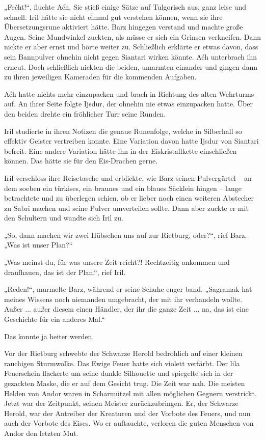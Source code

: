 „Fećht!“, fluchte Aćh. Sie stieß einige Sätze auf Tulgorisch aus, ganz leise und schnell. Iril hätte sie nicht einmal gut verstehen können, wenn sie ihre Übersetzungsrune aktiviert hätte. Barz hingegen verstand und machte große Augen. Seine Mundwinkel zuckten, als müsse er sich ein Grinsen verkneifen. Dann nickte er aber ernst und hörte weiter zu. Schließlich erklärte er etwas davon, dass sein Bannpulver ohnehin nicht gegen Siantari wirken könnte. Aćh unterbrach ihn erneut. Doch schließlich nickten die beiden, umarmten einander und gingen dann zu ihren jeweiligen Kameraden für die kommenden Aufgaben.

Aćh hatte nichts mehr einzupacken und brach in Richtung des alten Wehrturms auf. An ihrer Seite folgte Ijsdur, der ohnehin nie etwas einzupacken hatte. Über den beiden drehte ein fröhlicher Turr seine Runden.

Iril studierte in ihren Notizen die genaue Runenfolge, welche in Silberhall so effektiv Geister vertreiben konnte. Eine Variation davon hatte Ijsdur von Siantari befreit. Eine andere Variation hätte ihn in der Eiskristallkette einschließen können. Das hätte sie für den Eis-Drachen gerne.

Iril verschloss ihre Reisetasche und erblickte, wie Barz seinen Pulvergürtel – an dem soeben ein türkises, ein braunes und ein blaues Säcklein hingen – lange betrachtete und zu überlegen schien, ob er lieber noch einen weiteren Abstecher zu Sabri machen und seine Pulver umverteilen sollte. Dann aber zuckte er mit den Schultern und wandte sich Iril zu.

„So, dann machen wir zwei Hübschen uns auf zur Rietburg, oder?“, rief Barz. „Was ist unser Plan?“

„Was meinst du, für was unsere Zeit reicht?! Rechtzeitig ankommen und draufhauen, das ist der Plan.“, rief Iril.

„Reden!“, murmelte Barz, während er seine Schuhe enger band. „Sagramak hat meines Wissens noch niemanden umgebracht, der mit ihr verhandeln wollte. Außer ... außer diesem einen Händler, der ihr die ganze Zeit ... na, das ist eine Geschichte für ein anderes Mal.“

Das konnte ja heiter werden.\bigskip







Vor der Rietburg schwebte der Schwarze Herold bedrohlich auf einer kleinen rauchigen Sturmwolke. Das Ewige Feuer hatte sich violett verfärbt. Der lila Feuerschein flackerte um seine dunkle Silhouette und spiegelte sich in der gezackten Maske, die er auf dem Gesicht trug. Die Zeit war nah. Die meisten Helden von Andor waren in Scharmützel mit allen möglichen Gegnern verstrickt. Jetzt war der Zeitpunkt, seinen Meister zurückzubringen. Er, der Schwarze Herold, war der Antreiber der Kreaturen und der Vorbote des Feuers, und nun auch der Vorbote des Eises. Wo er auftauchte, verloren die guten Menschen von Andor den letzten Mut.

